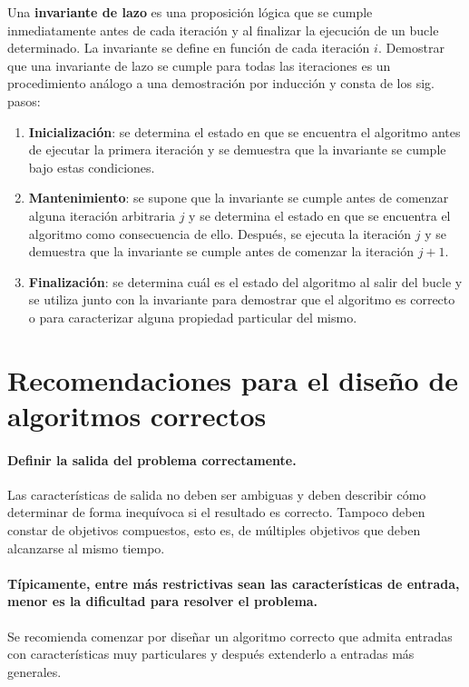 Una \textbf{invariante de lazo} es una proposición lógica que se cumple inmediatamente antes de cada iteración y al finalizar la ejecución de un bucle determinado.
La invariante se define en función de cada iteración \(i\).
Demostrar que una invariante de lazo se cumple para todas las iteraciones es un procedimiento análogo a una demostración por inducción y consta de los sig. pasos: 
\begin{enumerate}
  \item \textbf{Inicialización}: se determina el estado en que se encuentra el algoritmo antes de ejecutar la primera iteración y se demuestra que la invariante se cumple bajo estas condiciones.
  \item \textbf{Mantenimiento}: se supone que la invariante se cumple antes de comenzar alguna iteración arbitraria \(j\) y se determina el estado en que se encuentra el algoritmo como consecuencia de ello. 
  Después, se ejecuta la iteración \(j\) y se demuestra que la invariante se cumple antes de comenzar la iteración \(j+1\).
  \item \textbf{Finalización}: se determina cuál es el estado del algoritmo al salir del bucle y se utiliza junto con la invariante para demostrar que el algoritmo es correcto o para caracterizar alguna propiedad particular del mismo. 
\end{enumerate}

\section{Recomendaciones para el diseño de algoritmos correctos}

\paragraph*{Definir la salida del problema correctamente.}{%
  Las características de salida no deben ser ambiguas y deben describir cómo determinar de forma inequívoca si el resultado es correcto.
  Tampoco deben constar de objetivos compuestos, esto es, de múltiples objetivos que deben alcanzarse al mismo tiempo.
}

\paragraph*{Típicamente, entre más restrictivas sean las características de entrada, menor es la dificultad para resolver el problema.}{
  Se recomienda comenzar por diseñar un algoritmo correcto que admita entradas con características muy particulares y después extenderlo a entradas más generales. 
}

